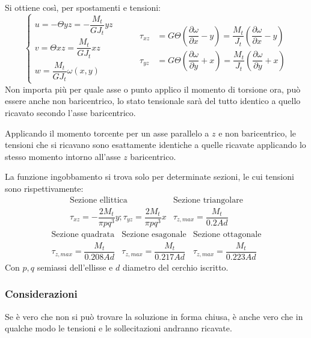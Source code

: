 		Si ottiene così, per spostamenti e tensioni: 
			\[ \begin{cases}
			u = -\Theta yz = -\dfrac{M_t}{GJ_t}yz \\
			v =  \Theta xz = \dfrac{M_t}{GJ_t}xz\\
			w = \dfrac{M_t}{GJ_t}\omega(x,y)
		\end{cases} \hspace{1cm} \begin{aligned}
		\tau_{xz} &= G\Theta \left(\dfrac{\partial \omega}{\partial x}-y\right) =\dfrac{M_t}{J_t}  \left(\dfrac{\partial \omega}{\partial x}-y\right) \\
		\tau_{yz} &= G \Theta \left(\dfrac{\partial \omega}{\partial y} + x\right) = \dfrac{M_t}{J_t} \left(\dfrac{\partial \omega}{\partial y} + x\right)
	\end{aligned}\]
	Non importa più per quale asse o punto applico il momento di torsione ora, può essere anche non baricentrico, lo stato tensionale sarà del tutto identico a quello ricavato secondo l'asse baricentrico. 
	
	Applicando il momento torcente per un asse parallelo a $z$ e non baricentrico, le tensioni che si ricavano sono esattamente identiche a quelle ricavate applicando lo stesso momento intorno all'asse $z$ baricentrico. \newline 
	
	La funzione ingobbamento si trova solo per determinate sezioni, le cui tensioni sono rispettivamente: 
	\[\begin{array}{cc}
		\text{Sezione ellittica} & \text{Sezione triangolare} \\ 
		\tau_{xz} = -\dfrac{2M_t}{\pi pq^3}y; \tau_{yz} = \dfrac{2M_t}{\pi pq^3}x  & \tau_{z, max} = \dfrac{M_t}{0.2Ad}  
	\end{array}\]
   \[\begin{array}{ccc}
   	\text{Sezione quadrata} & \text{Sezione esagonale} & \text{Sezione ottagonale} \\
   	\tau_{z, max} = \dfrac{M_t}{0.208Ad} & \tau_{z, max} = \dfrac{M_t}{0.217Ad} & \tau_{z, max} = \dfrac{M_t}{0.223Ad}
   \end{array}\]
			Con $p,q$ semiassi dell'ellisse e $d$ diametro del cerchio iscritto.  
			
\subsubsection{Considerazioni}
			Se è vero che non si può trovare la soluzione in forma chiusa, è anche vero che in qualche modo le tensioni e le sollecitazioni andranno ricavate. 
			
